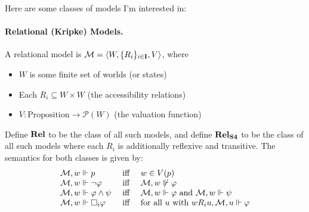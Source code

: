 \documentclass[letterpaper]{article}
\begin{document}
Here are some classes of models I'm interested in:

\paragraph*{Relational (Kripke) Models.} A relational model is $\mathcal{M} = \langle W, \{ R_i \}_{i \in \textbf{I}}, V \rangle$, where 
\begin{itemize}
    \item $W$ is some finite set of worlds (or states)
    \item Each $R_i \subseteq W \times W$ (the accessibility relations)
    \item $V : \textrm{Proposition} \to \mathcal{P}(W)$ (the valuation function)
\end{itemize}
Define $\textrm{\textbf{Rel}}$ to be the class of all such models, and define $\textrm{\textbf{Rel}}_\textrm{\textbf{S4}}$ to be the class of all such models where each $R_i$ is additionally reflexive and transitive.  The semantics for both classes is given by:
\[
\begin{array}{lcl}
    \mathcal{M}, w \Vdash p & \mbox{ iff } & w \in V(p)\\
    \mathcal{M}, w \Vdash \neg \varphi & \mbox{ iff } & \mathcal{M}, w \not \Vdash \varphi\\
    \mathcal{M}, w \Vdash \varphi \land \psi & \mbox{ iff } & \mathcal{M}, w \Vdash \varphi \mbox{ and } \mathcal{M}, w \Vdash \psi\\
    \mathcal{M}, w \Vdash \Box_i \varphi & \mbox{ iff } & \mbox{for all } u \mbox{ with } w{R_i}u, \mathcal{M}, u \Vdash \varphi
\end{array}
\]
\end{document}
